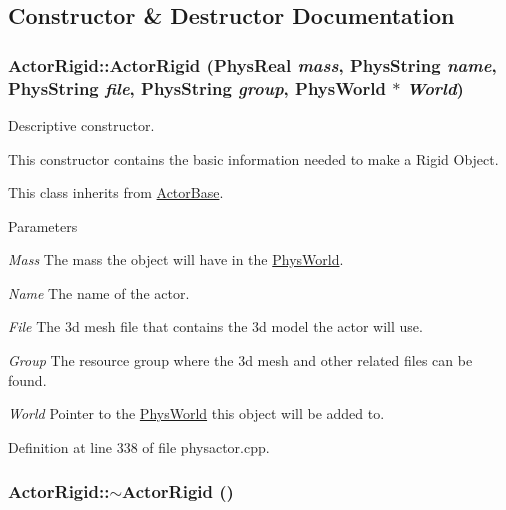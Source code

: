 \subsection{Constructor \& Destructor Documentation}
\hypertarget{classActorRigid_a8313ce86811d7233b8672f562306976c}{
\subsubsection[{ActorRigid}]{\setlength{\rightskip}{0pt plus 5cm}ActorRigid::ActorRigid (PhysReal {\em mass}, \/  PhysString {\em name}, \/  PhysString {\em file}, \/  PhysString {\em group}, \/  {\bf PhysWorld} $\ast$ {\em World})}}
\label{d5/d10/classActorRigid_a8313ce86811d7233b8672f562306976c}


Descriptive constructor. 

This constructor contains the basic information needed to make a Rigid Object. \par
 This class inherits from \hyperlink{classActorBase}{ActorBase}. 
\begin{DoxyParams}{Parameters}
\item[{\em Mass}]The mass the object will have in the \hyperlink{classPhysWorld}{PhysWorld}. \item[{\em Name}]The name of the actor. \item[{\em File}]The 3d mesh file that contains the 3d model the actor will use. \item[{\em Group}]The resource group where the 3d mesh and other related files can be found. \item[{\em World}]Pointer to the \hyperlink{classPhysWorld}{PhysWorld} this object will be added to. \end{DoxyParams}


Definition at line 338 of file physactor.cpp.

\hypertarget{classActorRigid_a36b9eb18fc9e83769a48eb1c34312889}{
\subsubsection[{$\sim$ActorRigid}]{\setlength{\rightskip}{0pt plus 5cm}ActorRigid::$\sim$ActorRigid ()}}
\label{d5/d10/classActorRigid_a36b9eb18fc9e83769a48eb1c34312889}


